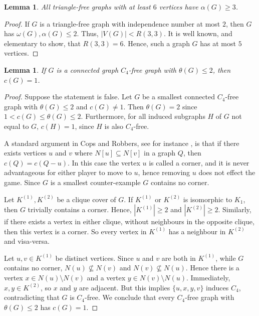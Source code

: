 \documentclass[12pt]{amsart}
\newtheorem{lemma}[theorem]{Lemma}
\theoremstyle{definition}
\begin{document}
\begin{lemma}\label{Lemma: alpha>2 Tri-free}
    All triangle-free graphs with at least $6$ vertices have $\alpha(G) \geq 3$.
\end{lemma}

\begin{proof}
    If $G$ is a triangle-free graph with independence number at most $2$, then $G$ has $\omega(G),\alpha(G) \leq 2$.
    Thus, $|V(G)|< R(3,3)$.
    It is well known, and elementary to show, that $R(3,3)= 6$.
    Hence, such a graph $G$ has at most $5$ vertices.
\end{proof}



\begin{lemma}\label{Lemma: theta=2 C4-free}
    If $G$ is a connected graph $C_4$-free graph with $\theta(G)\leq 2$, then $c(G) = 1$.
\end{lemma}

\begin{proof}
    Suppose the statement is false.
    Let $G$ be a smallest connected $C_4$-free graph with $\theta(G) \leq 2$ and $c(G) \neq 1$.
    Then $\theta(G) =2$ since $1< c(G) \leq \theta(G) \leq 2$.
    Furthermore, for all induced subgraphs $H$ of $G$ not equal to $G$,  $c(H) = 1$, since $H$ is also $C_4$-free.

    A standard argument in Cops and Robbers, see for instance \cite{bonato2011game}, 
    is that if there exists vertices $u$ and $v$ where $N[u]\subseteq N[v]$ in a graph $Q$,
    then $c(Q) = c(Q-u)$.
    In this case the vertex $u$ is called a corner, and it is never advantageous for either player to move to $u$, hence removing $u$ does not effect the game.
    Since $G$ is a smallest counter-example $G$ contains no corner.

   Let $K^{(1)},K^{(2)}$ be a clique cover of $G$. If $K^{(1)}$ or $K^{(2)}$ is isomorphic to $K_1$, then $G$ trivially contains a corner.
   Hence, $|K^{(1)}|\geq 2$ and $|K^{(2)}|\geq 2$.
   Similarly, if there exists a vertex in either clique, without neighbours in the opposite clique, then this vertex is a corner.
   So every vertex in $K^{(1)}$ has a neighbour in $K^{(2)}$ and visa-versa.
   
   Let $u,v \in K^{(1)}$ be distinct vertices.
   Since $u$ and $v$ are both in $K^{(1)}$, while $G$ contains no corner, $N(u) \not\subseteq N(v)$ and $N(v) \not\subseteq N(u)$.
   Hence there is a vertex $x \in N(u) \setminus N(v)$ and a vertex $y \in N(v) \setminus N(u)$.
   Immediately, $x,y \in K^{(2)}$, so $x$ and $y$ are adjacent.
   But this implies $\{u,x,y,v\}$ induces $C_4$, contradicting that $G$ is $C_4$-free.
   We conclude that every $C_4$-free graph with $\theta(G) \leq 2$ has $c(G) = 1$.
\end{proof}
\end{document}
